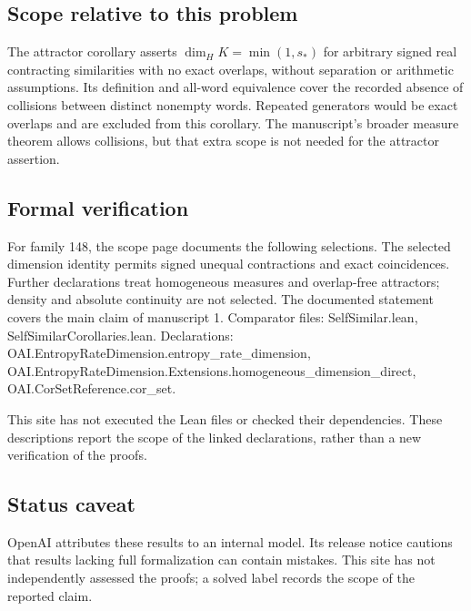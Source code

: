 \documentclass[11pt]{article}
\begin{document}
\subsection{Scope relative to this problem}
The attractor corollary asserts $\dim_HK=\min(1,s_*)$ for arbitrary signed real contracting similarities with no exact overlaps, without separation or arithmetic assumptions. Its definition and all-word equivalence cover the recorded absence of collisions between distinct nonempty words. Repeated generators would be exact overlaps and are excluded from this corollary. The manuscript's broader measure theorem allows collisions, but that extra scope is not needed for the attractor assertion.

\subsection{Formal verification}
For family 148, the scope page documents the following selections. The selected dimension identity permits signed unequal contractions and exact coincidences. Further declarations treat homogeneous measures and overlap-free attractors; density and absolute continuity are not selected. The documented statement covers the main claim of manuscript 1. Comparator files: SelfSimilar.lean, SelfSimilarCorollaries.lean. Declarations: OAI.EntropyRateDimension.entropy\_rate\_dimension, OAI.EntropyRateDimension.Extensions.homogeneous\_dimension\_direct, OAI.CorSetReference.cor\_set.

This site has not executed the Lean files or checked their dependencies. These descriptions report the scope of the linked declarations, rather than a new verification of the proofs.

\subsection{Status caveat}
OpenAI attributes these results to an internal model. Its release notice cautions that results lacking full formalization can contain mistakes. This site has not independently assessed the proofs; a solved label records the scope of the reported claim.
\end{document}
